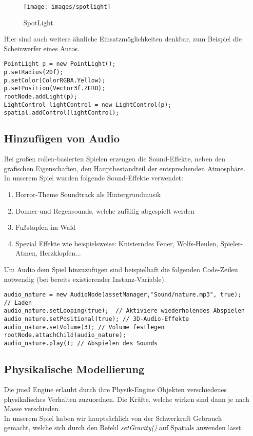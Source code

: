 \begin{figure}[H]
	
	
	\caption{SpotLight}
	
	\centering\texttt{[image: images/spotlight]} 
	
\end{figure}



 Hier sind auch weitere ähnliche Einsatzmöglichkeiten denkbar, zum Beispiel die Scheinwerfer eines Autos. 

\begin{lstlisting}
PointLight p = new PointLight();
p.setRadius(20f);
p.setColor(ColorRGBA.Yellow); 
p.setPosition(Vector3f.ZERO);
rootNode.addLight(p);
LightControl lightControl = new LightControl(p);
spatial.addControl(lightControl); 
\end{lstlisting}

\subsection{Hinzufügen von Audio}
Bei großen rollen-basierten Spielen erzeugen die Sound-Effekte, neben den grafischen Eigenschaften, den Hauptbestandteil der entsprechenden Atmosphäre. In unserem Spiel wurden folgende Sound-Effekte verwendet:
\begin{enumerate}
	\item Horror-Theme Soundtrack als Hintergrundmusik
	\item Donner-und Regensounds, welche zufällig abgespielt werden
	\item Fußstapfen im Wald
	\item Spezial Effekte wie beispielsweise: Knisterndes Feuer, Wolfs-Heulen, Spieler-Atmen, Herzklopfen...
\end{enumerate} Um Audio dem Spiel hinzuzufügen sind beispielhaft die folgenden Code-Zeilen notwendig (bei bereits existierender Instanz-Variable).

\begin{lstlisting}
audio_nature = new AudioNode(assetManager,"Sound/nature.mp3", true); // Laden
audio_nature.setLooping(true);  // Aktiviere wiederholendes Abspielen
audio_nature.setPositional(true); // 3D-Audio-Effekte  
audio_nature.setVolume(3); // Volume festlegen
rootNode.attachChild(audio_nature); 
audio_nature.play(); // Abspielen des Sounds
\end{lstlisting}


\subsection{Physikalische Modellierung}
Die jme3 Engine erlaubt durch ihre Physik-Engine Objekten verschiedenes physikalisches Verhalten zuzuordnen. Die Kräfte, welche wirken sind dann je nach Masse verschieden.\\
In unserem Spiel haben wir hauptsächlich von der Schwerkraft Gebrauch gemacht, welche sich durch den Befehl\emph{ setGravity()} auf Spatials anwenden lässt.

